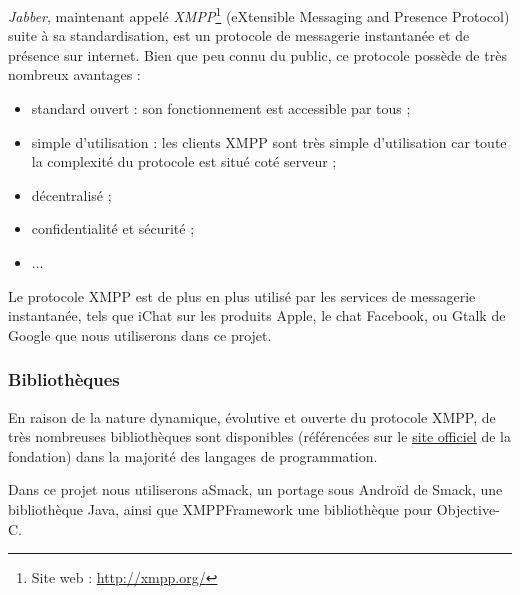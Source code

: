 \textit{Jabber}, maintenant appelé \textit{XMPP}\footnote{Site web : \href{http://xmpp.org/}{http://xmpp.org/}} (eXtensible Messaging and Presence Protocol) suite à sa standardisation, est un protocole de messagerie instantanée et de présence sur internet.
Bien que peu connu du public, ce protocole possède de très nombreux avantages :
\begin{itemize}
	\item standard ouvert : son fonctionnement est accessible par tous ;
	\item simple d'utilisation : les clients XMPP sont très simple d'utilisation car toute la complexité du protocole est situé coté serveur ;
	\item décentralisé ;
	\item confidentialité et sécurité ;
	\item ...
\\
\end{itemize}

Le protocole XMPP est de plus en plus utilisé par les services de messagerie instantanée, tels que iChat sur les produits Apple, le chat Facebook, ou Gtalk de Google que nous utiliserons dans ce projet.
\\


\subsubsection{Bibliothèques}

En raison de la nature dynamique, évolutive et ouverte du protocole XMPP, de très nombreuses bibliothèques sont disponibles (référencées sur le \href{http://xmpp.org/xmpp-software/libraries/}{site officiel} de la fondation) dans la majorité des langages de programmation.

Dans ce projet nous utiliserons aSmack, un portage sous Androïd de Smack, une bibliothèque Java, ainsi que XMPPFramework une bibliothèque pour Objective-C.
\\




